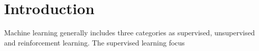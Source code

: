 \section{Introduction}

Machine learning generally includes three categories as supervised, unsupervised and reinforcement learning. The supervised learning focus 
